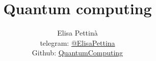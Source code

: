 

\title{\Huge\textbf{{Quantum computing}}}

\author{
  Elisa Pettinà \\
  \small telegram: \href{https://t.me/elisapettina}{@ElisaPettina} \\[3pt]
\small Github: \href{https://github.com/Elisshaze/QuantumComputing}{QuantumComputing}
}


\maketitle
\tableofcontents




